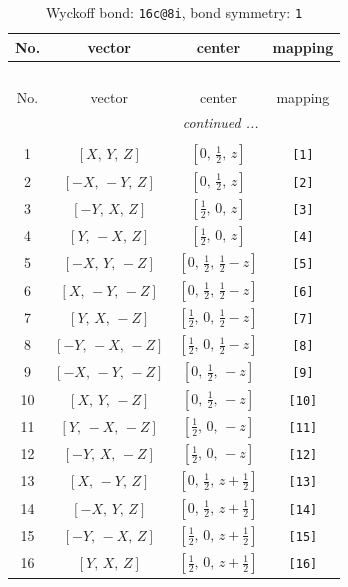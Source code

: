 \documentclass[fleqn,8pt]{jsarticle}
\begin{document}
\begin{longtable}{cccc}
\caption{Wyckoff bond: {\tt 16c@8i}, bond symmetry: {\tt 1}}
 \\
 \hline \hline
No. & vector & center & mapping \\ \hline \endfirsthead

\multicolumn{3}{l}{\tablename\ \thetable{}} \\
 \hline \hline
No. & vector & center & mapping \\ \hline \endhead

 \hline \hline
\multicolumn{3}{r}{\footnotesize\it continued ...} \\ \endfoot

 \hline \hline
\multicolumn{3}{r}{} \\ \endlastfoot

1 & $\left[ X,\, Y,\, Z \right]$ & $\left[ 0,\, \frac{1}{2},\, z \right]$ & {\tt [1]} \\ \hline
2 & $\left[ - X,\, - Y,\, Z \right]$ & $\left[ 0,\, \frac{1}{2},\, z \right]$ & {\tt [2]} \\ \hline
3 & $\left[ - Y,\, X,\, Z \right]$ & $\left[ \frac{1}{2},\, 0,\, z \right]$ & {\tt [3]} \\ \hline
4 & $\left[ Y,\, - X,\, Z \right]$ & $\left[ \frac{1}{2},\, 0,\, z \right]$ & {\tt [4]} \\ \hline
5 & $\left[ - X,\, Y,\, - Z \right]$ & $\left[ 0,\, \frac{1}{2},\, \frac{1}{2} - z \right]$ & {\tt [5]} \\ \hline
6 & $\left[ X,\, - Y,\, - Z \right]$ & $\left[ 0,\, \frac{1}{2},\, \frac{1}{2} - z \right]$ & {\tt [6]} \\ \hline
7 & $\left[ Y,\, X,\, - Z \right]$ & $\left[ \frac{1}{2},\, 0,\, \frac{1}{2} - z \right]$ & {\tt [7]} \\ \hline
8 & $\left[ - Y,\, - X,\, - Z \right]$ & $\left[ \frac{1}{2},\, 0,\, \frac{1}{2} - z \right]$ & {\tt [8]} \\ \hline
9 & $\left[ - X,\, - Y,\, - Z \right]$ & $\left[ 0,\, \frac{1}{2},\, - z \right]$ & {\tt [9]} \\ \hline
10 & $\left[ X,\, Y,\, - Z \right]$ & $\left[ 0,\, \frac{1}{2},\, - z \right]$ & {\tt [10]} \\ \hline
11 & $\left[ Y,\, - X,\, - Z \right]$ & $\left[ \frac{1}{2},\, 0,\, - z \right]$ & {\tt [11]} \\ \hline
12 & $\left[ - Y,\, X,\, - Z \right]$ & $\left[ \frac{1}{2},\, 0,\, - z \right]$ & {\tt [12]} \\ \hline
13 & $\left[ X,\, - Y,\, Z \right]$ & $\left[ 0,\, \frac{1}{2},\, z + \frac{1}{2} \right]$ & {\tt [13]} \\ \hline
14 & $\left[ - X,\, Y,\, Z \right]$ & $\left[ 0,\, \frac{1}{2},\, z + \frac{1}{2} \right]$ & {\tt [14]} \\ \hline
15 & $\left[ - Y,\, - X,\, Z \right]$ & $\left[ \frac{1}{2},\, 0,\, z + \frac{1}{2} \right]$ & {\tt [15]} \\ \hline
16 & $\left[ Y,\, X,\, Z \right]$ & $\left[ \frac{1}{2},\, 0,\, z + \frac{1}{2} \right]$ & {\tt [16]} \\
\end{longtable}
\end{document}
